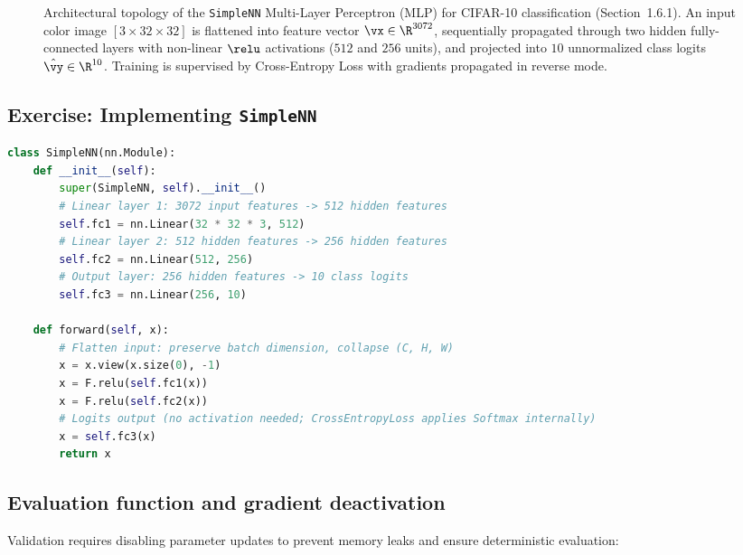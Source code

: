 \documentclass[../labs.tex]{subfiles}
\begin{document}
\begin{figure}[htbp]
{%
}
\caption{Architectural topology of the \texttt{SimpleNN} Multi-Layer Perceptron (MLP) for CIFAR-10 classification (Section~1.6.1). An input color image $[3 \times 32 \times 32]$ is flattened into feature vector $\vx \in \R^{3072}$, sequentially propagated through two hidden fully-connected layers with non-linear $\relu$ activations ($512$ and $256$ units), and projected into $10$ unnormalized class logits $\hat{\vy} \in \R^{10}$. Training is supervised by Cross-Entropy Loss with gradients propagated in reverse mode.}
\label{fig:lab01_simplenn_architecture}
\end{figure}

\subsection{Exercise: Implementing \texttt{SimpleNN}}

\begin{lstlisting}[language=Python, caption={Verified implementation of \texttt{SimpleNN} architecture (Cell 42).}, label={lst:lab01_simplenn}]
class SimpleNN(nn.Module):
    def __init__(self):
        super(SimpleNN, self).__init__()
        # Linear layer 1: 3072 input features -> 512 hidden features
        self.fc1 = nn.Linear(32 * 32 * 3, 512)
        # Linear layer 2: 512 hidden features -> 256 hidden features
        self.fc2 = nn.Linear(512, 256)
        # Output layer: 256 hidden features -> 10 class logits
        self.fc3 = nn.Linear(256, 10)

    def forward(self, x):
        # Flatten input: preserve batch dimension, collapse (C, H, W)
        x = x.view(x.size(0), -1)
        x = F.relu(self.fc1(x))
        x = F.relu(self.fc2(x))
        # Logits output (no activation needed; CrossEntropyLoss applies Softmax internally)
        x = self.fc3(x)
        return x
\end{lstlisting}

\subsection{Evaluation function and gradient deactivation}
Validation requires disabling parameter updates to prevent memory leaks and ensure deterministic evaluation:
\end{document}
